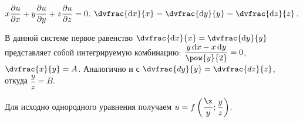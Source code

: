 \documentclass[a5paper,10pt]{article}
\begin{document}
    $x \dfrac{\partial u}{\partial x} + y \dfrac{\partial u}{\partial y} + z \dfrac{\partial u}{\partial z} = 0$.
    $\dvfrac {\di x} {x} = \dvfrac {\di y} {y} = \dvfrac {\di z} {z}$.

    В данной системе первое равенство $\dvfrac {\di x} {x} = \dvfrac {\di y} {y}$
    представляет собой интегрируемую комбинацию:
    $\dfrac {y \di x - x \di y} {\pow{y}{2}} = 0$, $\dvfrac {x} {y} = A$.
    Аналогично и с $\dvfrac {d y} {y} = \dvfrac {d z} {z}$, откуда $\dfrac {y} {z} = B$.

    Для исходно однородного уравнения получаем 
    $u = f\br{\dfrac {\elevate[0.4mm]{\x}} {y}; \dfrac {y} {z}}$.
\end{document}
